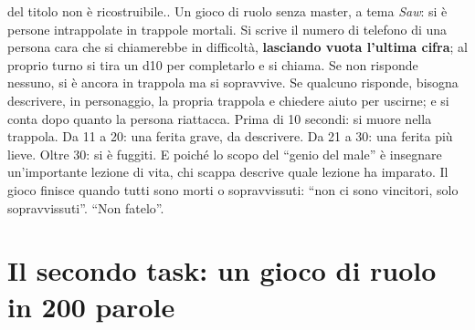 \begin{description}
{        del titolo non è ricostruibile.}. Un gioco di ruolo senza master, a tema
        \emph{Saw}: si è persone intrappolate in trappole mortali. Si scrive il numero
        di telefono di una persona cara che si chiamerebbe in difficoltà,
        \textbf{lasciando vuota l'ultima cifra}; al proprio turno si tira un d10 per
        completarlo e si chiama. Se non risponde nessuno, si è ancora in trappola ma si
        sopravvive. Se qualcuno risponde, bisogna descrivere, in personaggio, la
        propria trappola e chiedere aiuto per uscirne; e si conta dopo quanto la persona
        riattacca. Prima di 10 secondi: si muore nella trappola. Da 11 a 20: una
        ferita grave, da descrivere. Da 21 a 30: una ferita più lieve. Oltre 30: si è
        fuggiti. E poiché lo scopo del ``genio del male'' è insegnare un'importante
        lezione di vita, chi scappa descrive quale lezione ha imparato. Il gioco finisce
        quando tutti sono morti o sopravvissuti: ``non ci sono vincitori, solo
        sopravvissuti''. ``Non fatelo''.
\end{description}

\section{Il secondo task: un gioco di ruolo in 200 parole}
\label{a5:sec:task}

